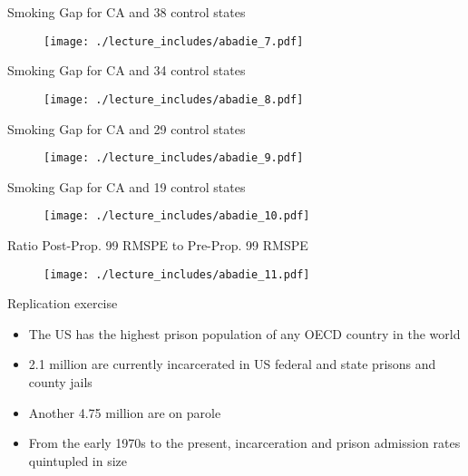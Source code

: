 \documentclass{beamer}
\begin{document}
\begin{frame}{Smoking Gap for CA and 38 control states}
	
	\begin{figure}
	\texttt{[image: ./lecture\_includes/abadie\_7.pdf]}
	\end{figure}
\end{frame}

\begin{frame}{Smoking Gap for CA and 34 control states}
	
	\begin{figure}
	\texttt{[image: ./lecture\_includes/abadie\_8.pdf]}
	\end{figure}
\end{frame}

\begin{frame}{Smoking Gap for CA and 29 control states}
	
	\begin{figure}
	\texttt{[image: ./lecture\_includes/abadie\_9.pdf]}
	\end{figure}
\end{frame}

\begin{frame}{Smoking Gap for CA and 19 control states}
	
	\begin{figure}
	\texttt{[image: ./lecture\_includes/abadie\_10.pdf]}
	\end{figure}
\end{frame}

\begin{frame}{Ratio Post-Prop. 99 RMSPE to Pre-Prop. 99 RMSPE}

	\begin{figure}
	\texttt{[image: ./lecture\_includes/abadie\_11.pdf]}
	\end{figure}
\end{frame}




\begin{frame}{Replication exercise}
	
	\begin{itemize}
	\item The US has the highest prison population of any OECD country in the world 
	\item 2.1 million are currently incarcerated in US federal and state prisons and county jails
	\item Another 4.75 million are on parole
	\item From the early 1970s to the present, incarceration and prison admission rates quintupled in size
	\end{itemize}
\end{frame}
\end{document}

